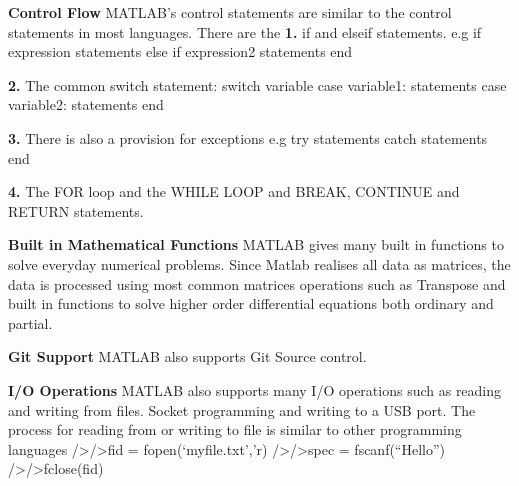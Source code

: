 \documentclass[fleqn,letterpaper,12pt]{report}
\begin{document}
\textbf{Control Flow}\newline
MATLAB’s control statements are similar to the control statements in most languages. There are the \newline
\textbf{1.} if and elseif statements.\newline
e.g\newline
if expression\newline
	statements\newline
else if expression2\newline
	statements\newline
end

\textbf{2.} The common switch statement:
switch variable\newline
case variable1:\newline
	statements\newline
case variable2:\newline
	statements\newline
end

\textbf{3.} There is also a provision for exceptions
e.g\newline
try \newline
	statements\newline
catch\newline
	statements\newline
end

\textbf{4.} The FOR loop and the WHILE LOOP and BREAK, CONTINUE and RETURN statements.

\textbf{Built in Mathematical Functions}\newline
MATLAB gives many built in functions to solve everyday numerical problems. Since Matlab realises all data as matrices, the data is processed using most common matrices operations such as Transpose and built in functions to solve higher order differential equations both ordinary and partial.

\textbf{Git Support}\newline
MATLAB also supports Git Source control. 

\textbf{I/O Operations}\newline
MATLAB also supports many I/O operations such as reading and writing from files. Socket programming and writing to a USB port.
The process for reading from or writing to  file is similar to other programming languages
/>/>fid = fopen(‘myfile.txt’,’r) %
/>/>spec = fscanf(“Hello”) %
/>/>fclose(fid) %
\end{document}
